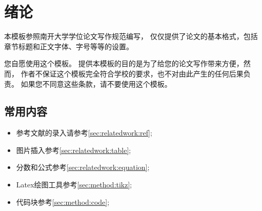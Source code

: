 
\chapter{绪论}
\label{chpt:introduction}


本模板参照南开大学学位论文写作规范编写，
仅仅提供了论文的基本格式，包括章节标题和正文字体、字号等等的设置。



您自愿使用这个模板。
提供本模板的目的是为了给您的论文写作带来方便，然而，
作者不保证这个模板完全符合学校的要求，也不对由此产生的任何后果负责。
如果您不同意这些条款，请不要使用这个模板。


\section{常用内容}

\begin{itemize}
  \item 参考文献的录入请参考\ref{sec:relatedwork:ref};
  \item 图片插入参考\ref{sec:relatedwork:table};
  \item 分数和公式参考\ref{sec:relatedwork:equation};  
  \item Latex绘图工具参考\ref{sec:method:tikz};
  \item 代码块参考\ref{sec:method:code}; 
\end{itemize}
